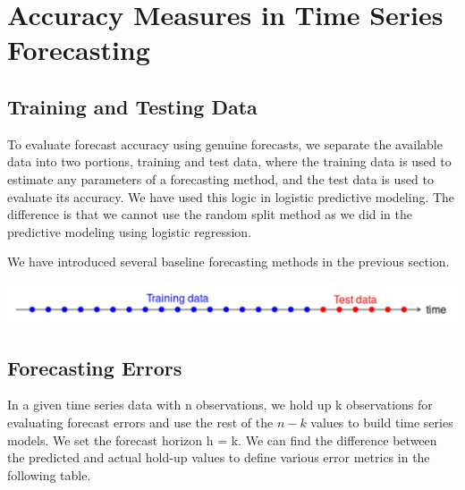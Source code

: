 \documentclass[
]{book}
\begin{document}
\hypertarget{accuracy-measures-in-time-series-forecasting}{%
\section{Accuracy Measures in Time Series Forecasting}\label{accuracy-measures-in-time-series-forecasting}}

\hypertarget{training-and-testing-data}{%
\subsection{Training and Testing Data}\label{training-and-testing-data}}

To evaluate forecast accuracy using genuine forecasts, we separate the available data into two portions, training and test data, where the training data is used to estimate any parameters of a forecasting method, and the test data is used to evaluate its accuracy. We have used this logic in logistic predictive modeling. The difference is that we cannot use the random split method as we did in the predictive modeling using logistic regression.

We have introduced several baseline forecasting methods in the previous section.

\begin{center}\includegraphics[width=0.8\linewidth]{img11/w11-TrainingTesting} \end{center}

\hypertarget{forecasting-errors}{%
\subsection{Forecasting Errors}\label{forecasting-errors}}

In a given time series data with n observations, we hold up k observations for evaluating forecast errors and use the rest of the \(n-k\) values to build time series models. We set the forecast horizon h = k. We can find the difference between the predicted and actual hold-up values to define various error metrics in the following table.
\end{document}
